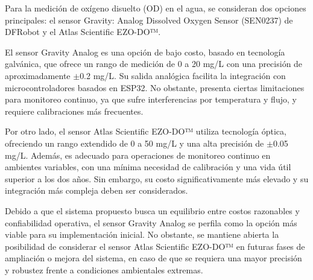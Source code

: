 Para la medición de oxígeno disuelto (OD) en el agua, se consideran dos opciones principales: el sensor Gravity: Analog Dissolved Oxygen Sensor (SEN0237) de DFRobot y el Atlas Scientific EZO-DO™.

El sensor Gravity Analog es una opción de bajo costo, basado en tecnología galvánica, que ofrece un rango de medición de 0 a 20 mg/L con una precisión de aproximadamente $\pm$0.2 mg/L. Su salida analógica facilita la integración con microcontroladores basados en ESP32. No obstante, presenta ciertas limitaciones para monitoreo continuo, ya que sufre interferencias por temperatura y flujo, y requiere calibraciones más frecuentes.

Por otro lado, el sensor Atlas Scientific EZO-DO™ utiliza tecnología óptica, ofreciendo un rango extendido de 0 a 50 mg/L y una alta precisión de $\pm$0.05 mg/L. Además, es adecuado para operaciones de monitoreo continuo en ambientes variables, con una mínima necesidad de calibración y una vida útil superior a los dos años. Sin embargo, su costo significativamente más elevado y su integración más compleja deben ser considerados.

Debido a que el sistema propuesto busca un equilibrio entre costos razonables y confiabilidad operativa, el sensor Gravity Analog se perfila como la opción más viable para su implementación inicial. No obstante, se mantiene abierta la posibilidad de considerar el sensor Atlas Scientific EZO-DO™ en futuras fases de ampliación o mejora del sistema, en caso de que se requiera una mayor precisión y robustez frente a condiciones ambientales extremas.

